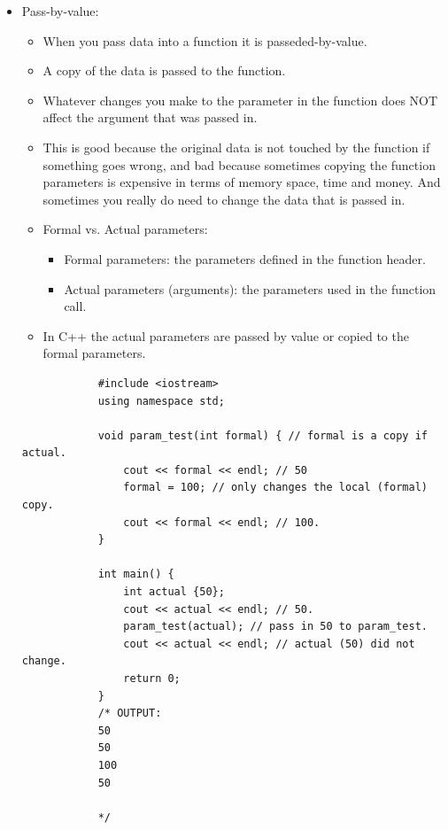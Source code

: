 \begin{itemize}
    \item Pass-by-value:
        \begin{itemize}
            \item When you pass data into a function it is passeded-by-value.
            \item A copy of the data is passed to the function.
            \item Whatever changes you make to the parameter in the function does NOT affect the argument that was passed in.
            \item This is good because the original data is not touched by the function if something goes wrong, and bad because sometimes copying the function parameters is expensive in terms of memory space, time and money. And sometimes you really do need to change the data that is passed in.
            \item Formal vs. Actual parameters:
                \begin{itemize}
                    \item Formal parameters: the parameters defined in the function header.
                    \item Actual parameters (arguments): the parameters used in the function call.
                \end{itemize}
            
            \item In C++ the actual parameters are passed by value or copied to the formal parameters.
        \end{itemize}
        \begin{verbatim}
            #include <iostream>
            using namespace std;

            void param_test(int formal) { // formal is a copy if actual.
                cout << formal << endl; // 50
                formal = 100; // only changes the local (formal) copy.
                cout << formal << endl; // 100.
            }

            int main() {
                int actual {50}; 
                cout << actual << endl; // 50.
                param_test(actual); // pass in 50 to param_test.
                cout << actual << endl; // actual (50) did not change.
                return 0;
            }
            /* OUTPUT:
            50
            50
            100
            50

            */
        \end{verbatim}
\end{itemize}

